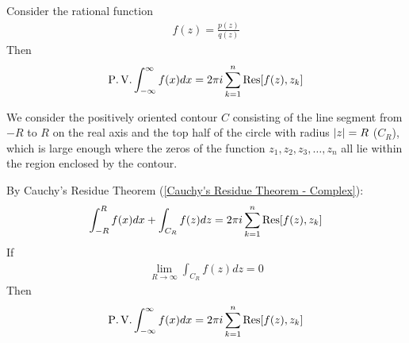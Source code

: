 \documentclass[12pt, english]{book}
\makeatletter
\renewenvironment{proof}[1][\proofname]{\par
	\pushQED{\qed}%
	\normalfont \topsep6\p@\@plus6\p@\relax
	\list{}{%
		\settowidth{\leftmargin}{\itshape\proofname:\hskip\labelsep}%
		\setlength{\labelwidth}{0pt}%
		\setlength{\itemindent}{-\leftmargin}%
		}%
	\item[\hskip\labelsep\itshape#1\@addpunct{:}]\ignorespaces
	}{\popQED\endlist\@endpefalse}
\makeatother
\begin{document}
	\begin{theorem}
		Consider the rational function 
		\begin{align*}
			f(z) = \frac{p(z)}{q(z)}
		\end{align*}
		Then
		\begin{align*}
			\operatorname{P.V.} \int_{-\infty}^{\infty} f(x) dx = 2\pi i \sum_{k=1}^{n} \Res[f(z), z_k]
		\end{align*}
	\end{theorem}
	\begin{proof}
		We consider the positively oriented contour \(C\) consisting of the line segment from \(-R\) to \(R\) on the real axis and the top half of the circle with radius \(\abs{z} = R\) (\(C_R\)), which is large enough where the zeros of the function \(z_1, z_2, z_3, \ldots, z_n\) all lie within the region enclosed by the contour. 
		
		\begin{figure}[H]
			\centering
		\end{figure}
		
		By Cauchy's Residue Theorem (\cref{Cauchy's Residue Theorem - Complex}):
		\begin{align*}
			\int_{-R}^{R} f(x) dx + \int_{C_R} f(z) dz = 2\pi i \sum_{k=1}^{n} \Res[f(z), z_k]
		\end{align*}
		If 
		\begin{align*}
			\lim_{R\rightarrow \infty} \int_{C_R} f(z) dz = 0
		\end{align*}
		Then
		\begin{align*}
			\operatorname{P.V.} \int_{-\infty}^{\infty} f(x) dx = 2\pi i \sum_{k=1}^{n} \Res[f(z), z_k]
		\end{align*}
	\end{proof}
	
\end{document}
